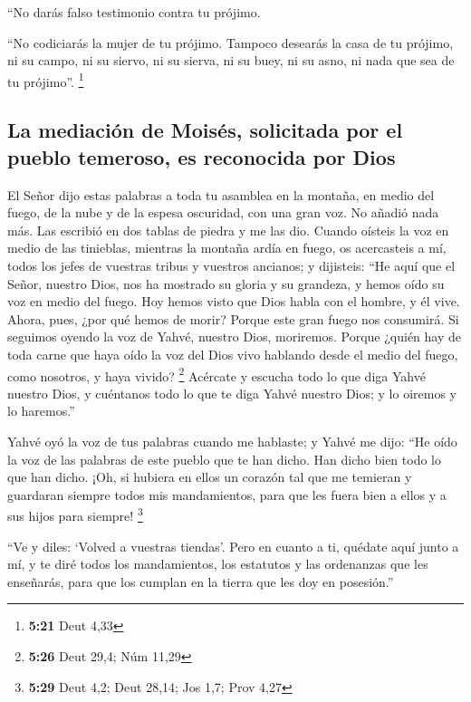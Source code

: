 \begin{paracol}{2}
 ``No darás falso testimonio contra tu prójimo.

 ``No codiciarás la mujer de tu prójimo. Tampoco desearás
la casa de tu prójimo, ni su campo, ni su siervo, ni su sierva, ni su
buey, ni su asno, ni nada que sea de tu prójimo''. \footnote{\textbf{5:21}
  Deut 4,33}

\hypertarget{la-mediaciuxf3n-de-moisuxe9s-solicitada-por-el-pueblo-temeroso-es-reconocida-por-dios}{%
\subsection{La mediación de Moisés, solicitada por el pueblo temeroso,
es reconocida por
Dios}\label{la-mediaciuxf3n-de-moisuxe9s-solicitada-por-el-pueblo-temeroso-es-reconocida-por-dios}}

 El Señor dijo estas palabras a toda tu asamblea en la
montaña, en medio del fuego, de la nube y de la espesa oscuridad, con
una gran voz. No añadió nada más. Las escribió en dos tablas de piedra y
me las dio.  Cuando oísteis la voz en medio de las
tinieblas, mientras la montaña ardía en fuego, os acercasteis a mí,
todos los jefes de vuestras tribus y vuestros ancianos; 
y dijisteis: ``He aquí que el Señor, nuestro Dios, nos ha mostrado su
gloria y su grandeza, y hemos oído su voz en medio del fuego. Hoy hemos
visto que Dios habla con el hombre, y él vive.  Ahora,
pues, ¿por qué hemos de morir? Porque este gran fuego nos consumirá. Si
seguimos oyendo la voz de Yahvé, nuestro Dios, moriremos.
 Porque ¿quién hay de toda carne que haya oído la voz del
Dios vivo hablando desde el medio del fuego, como nosotros, y haya
vivido? \footnote{\textbf{5:26} Deut 29,4; Núm 11,29} 
Acércate y escucha todo lo que diga Yahvé nuestro Dios, y cuéntanos todo
lo que te diga Yahvé nuestro Dios; y lo oiremos y lo haremos.''

 Yahvé oyó la voz de tus palabras cuando me hablaste; y
Yahvé me dijo: ``He oído la voz de las palabras de este pueblo que te
han dicho. Han dicho bien todo lo que han dicho.  ¡Oh, si
hubiera en ellos un corazón tal que me temieran y guardaran siempre
todos mis mandamientos, para que les fuera bien a ellos y a sus hijos
para siempre! \footnote{\textbf{5:29} Deut 4,2; Deut 28,14; Jos 1,7;
  Prov 4,27}

 ``Ve y diles: `Volved a vuestras tiendas'.
 Pero en cuanto a ti, quédate aquí junto a mí, y te diré
todos los mandamientos, los estatutos y las ordenanzas que les
enseñarás, para que los cumplan en la tierra que les doy en posesión.''


\end{paracol}
